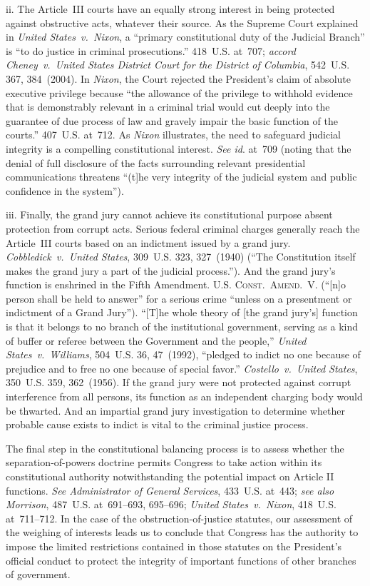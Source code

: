 ii. The Article~III courts have an equally strong interest in being protected against obstructive acts, whatever their source.
As the Supreme Court explained in \textit{United States~v.\ Nixon}, a ``primary constitutional duty of the Judicial Branch'' is ``to do justice in criminal prosecutions.'' 418~U.S. at~707;
\textit{accord Cheney~v.\ United States District Court for the District of Columbia}, 542~U.S. 367, 384~(2004).
In \textit{Nixon}, the Court rejected the President's claim of absolute executive privilege because ``the allowance of the privilege to withhold evidence that is demonstrably relevant in a criminal trial would cut deeply into the guarantee of due process of law and gravely impair the basic function of the courts.'' 407~U.S. at~712.
As \textit{Nixon} illustrates, the need to safeguard judicial integrity is a compelling constitutional interest.
\textit{See id}. at~709 (noting that the denial of full disclosure of the facts surrounding relevant presidential communications threatens ``(t]he very integrity of the judicial system and public confidence in the system'').

iii. Finally, the grand jury cannot achieve its constitutional purpose absent protection from corrupt acts.
Serious federal criminal charges generally reach the Article~III courts based on an indictment issued by a grand jury.
\textit{Cobbledick~v.\ United States}, 309~U.S. 323, 327~(1940) (``The Constitution itself makes the grand jury a part of the judicial process.'').
And the grand jury's function is enshrined in the Fifth Amendment.
\textsc{U.S. Const.\ Amend.~V}. (``[n]o person shall be held to answer'' for a serious crime ``unless on a presentment or indictment of a Grand Jury'').
``[T]he whole theory of [the grand jury's] function is that it belongs to no branch of the institutional government, serving as a kind of buffer or referee between the Government and the people,'' \textit{United States~v.\ Williams}, 504~U.S. 36, 47~(1992), ``pledged to indict no one because of prejudice and to free no one because of special favor.''
\textit{Costello~v.\ United States}, 350~U.S. 359, 362~(1956).
If the grand jury were not protected against corrupt interference from all persons, its function as an independent charging body would be thwarted.
And an impartial grand jury investigation to determine whether probable cause exists to indict is vital to the criminal justice process.

\hr

The final step in the constitutional balancing process is to assess whether the separation-of-powers doctrine permits Congress to take action within its constitutional authority notwithstanding the potential impact on Article II functions.
\textit{See Administrator of General Services}, 433~U.S. at~443;
\textit{see also Morrison}, 487~U.S. at~691--693, 695--696;
\textit{United States~v.\ Nixon}, 418~U.S. at~711--712.
In the case of the obstruction-of-justice statutes, our assessment of the weighing of interests leads us to conclude that Congress has the authority to impose the limited restrictions contained in those statutes on the President's official conduct to protect the integrity of important functions of other branches of government.

